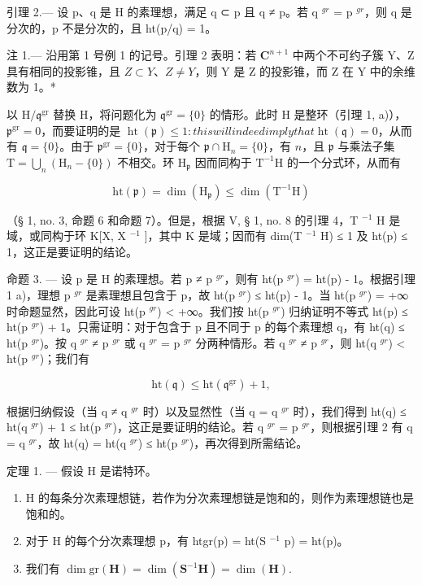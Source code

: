 引理 2.--- 设 p、q 是 H 的素理想，满足 q ⊂ p 且 q ≠ p。若 q \(^{gr}\) = p \(^{gr}\)，则 q 是分次的，p 不是分次的，且 ht(p/q) = 1。

注 1.--- 沿用第 1 号例 1 的记号。引理 2 表明：若 \(\mathbf{C}^{n+1}\) 中两个不可约子簇 Y、Z 具有相同的投影锥，且 \(Z \subset Y\)、\(Z \neq Y\)，则 Y 是 Z 的投影锥，而 Z 在 Y 中的余维数为 1。*

以 \(\mathrm{H} / \mathfrak{q}^{\mathrm{gr}}\) 替换 H，将问题化为 \(\mathfrak{q}^{\mathrm{gr}} = \{0\}\) 的情形。此时 H 是整环（引理 1, a)），\(\mathfrak{p}^{\mathrm{gr}} = 0\)，而要证明的是 \(\operatorname{ht}(\mathfrak{p}) \leqslant 1: this will indeed imply that  \operatorname{ht}(\mathfrak{q}) = 0\)，从而有 \(\mathfrak{q} = \{0\}\)。由于 \(\mathfrak{p}^{\mathrm{gr}} = \{0\}\)，对于每个 \(\mathfrak{p} \cap \mathrm{H}_n = \{0\}\)，有 \(n\)，且 \(\mathfrak{p}\) 与乘法子集 \(\mathrm{T} = \bigcup_{n} (\mathrm{H}_n - \{0\})\) 不相交。环 \(\mathrm{H}_{\mathfrak{p}}\) 因而同构于 \(\mathrm{T}^{-1}\mathrm{H}\) 的一个分式环，从而有

\[
\mathrm{ht} (\mathfrak {p}) = \dim (\mathrm{H} _ {\mathfrak {p}}) \leqslant \dim (\mathrm{T} ^ {- 1} \mathrm{H})
\]

（§ 1, no. 3, 命题 6 和命题 7）。但是，根据 V, § 1, no. 8 的引理 4，T \(^{-1}\) H 是域，或同构于环 K{[}X, X \(^{-1}\) {]}，其中 K 是域；因而有 dim(T \(^{-1}\) H) ≤ 1 及 ht(p) ≤ 1，这正是要证明的结论。

命题 3. --- 设 p 是 H 的素理想。若 p ≠ p \(^{gr}\)，则有 ht(p \(^{gr}\)) = ht(p) - 1。根据引理 1 a)，理想 p \(^{gr}\) 是素理想且包含于 p，故 ht(p \(^{gr}\)) ≤ ht(p) - 1。当 ht(p \(^{gr}\)) = +∞ 时命题显然，因此可设 ht(p \(^{gr}\)) \textless{} +∞。我们按 ht(p \(^{gr}\)) 归纳证明不等式 ht(p) ≤ ht(p \(^{gr}\)) + 1。只需证明：对于包含于 p 且不同于 p 的每个素理想 q，有 ht(q) ≤ ht(p \(^{gr}\))。按 q \(^{gr}\) ≠ p \(^{gr}\) 或 q \(^{gr}\) = p \(^{gr}\) 分两种情形。若 q \(^{gr}\) ≠ p \(^{gr}\)，则 ht(q \(^{gr}\)) \textless{} ht(p \(^{gr}\))；我们有

\[
\mathrm{ht} (\mathfrak {q}) \leqslant \mathrm{ht} (\mathfrak {q} ^ {\mathrm{gr}}) + 1,
\]

根据归纳假设（当 q ≠ q \(^{gr}\) 时）以及显然性（当 q = q \(^{gr}\) 时），我们得到 ht(q) ≤ ht(q \(^{gr}\)) + 1 ≤ ht(p \(^{gr}\))，这正是要证明的结论。若 q \(^{gr}\) = p \(^{gr}\)，则根据引理 2 有 q = q \(^{gr}\)，故 ht(q) = ht(q \(^{gr}\)) ≤ ht(p \(^{gr}\))，再次得到所需结论。

定理 1. --- 假设 H 是诺特环。

\begin{enumerate}
\def\labelenumi{\alph{enumi})}
\item
  H 的每条分次素理想链，若作为分次素理想链是饱和的，则作为素理想链也是饱和的。
\item
  对于 H 的每个分次素理想 p，有 htgr(p) = ht(S \(^{-1}\) p) = ht(p)。
\item
  我们有 \(\dim \mathrm{gr}(\mathbf{H}) = \dim (\mathbf{S}^{-1}\mathbf{H}) = \dim (\mathbf{H}).\)
\end{enumerate}

